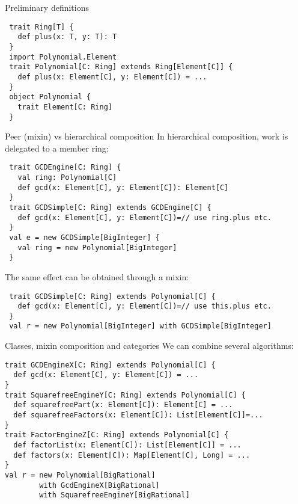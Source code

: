 \documentclass[final]{beamer}
\begin{document}
\begin{frame}[fragile]
\begin{columns}[t]
\begin{column}{.3\linewidth}

  \begin{block}{\large Preliminary definitions}
\tiny %
\begin{lstlisting}
 trait Ring[T] {
   def plus(x: T, y: T): T
 }
 import Polynomial.Element
 trait Polynomial[C: Ring] extends Ring[Element[C]] {
   def plus(x: Element[C], y: Element[C]) = ...
 }
 object Polynomial {
   trait Element[C: Ring]
 }
\end{lstlisting}
  \end{block}
  \hfill
  \begin{block}{\large Peer (mixin) vs hierarchical composition}
\tiny %
{\footnotesize In hierarchical composition, work is delegated to
a member ring:}\par
\begin{lstlisting}
 trait GCDEngine[C: Ring] {
   val ring: Polynomial[C]
   def gcd(x: Element[C], y: Element[C]): Element[C]
 }
 trait GCDSimple[C: Ring] extends GCDEngine[C] {
   def gcd(x: Element[C], y: Element[C])=// use ring.plus etc.
 }
 val e = new GCDSimple[BigInteger] {
   val ring = new Polynomial[BigInteger]
 }
\end{lstlisting}
{\footnotesize The same effect can be obtained through a mixin:}\par
\begin{lstlisting}
 trait GCDSimple[C: Ring] extends Polynomial[C] {
   def gcd(x: Element[C], y: Element[C])=// use this.plus etc.
 }
 val r = new Polynomial[BigInteger] with GCDSimple[BigInteger]
\end{lstlisting}
  \end{block}
  \hfill
  \begin{block}{\large Classes, mixin composition and categories}
\tiny %
{\footnotesize We can combine several algorithms:}\par
\begin{lstlisting}
trait GCDEngineX[C: Ring] extends Polynomial[C] {
  def gcd(x: Element[C], y: Element[C]) = ...
}
trait SquarefreeEngineY[C: Ring] extends Polynomial[C] {
  def squarefreePart(x: Element[C]): Element[C] = ...
  def squarefreeFactors(x: Element[C]): List[Element[C]]=...
}
trait FactorEngineZ[C: Ring] extends Polynomial[C] {
  def factorList(x: Element[C]): List[Element[C]] = ...
  def factors(x: Element[C]): Map[Element[C], Long] = ...
}
val r = new Polynomial[BigRational]
        with GcdEngineX[BigRational] 
        with SquarefreeEngineY[BigRational]

\end{lstlisting}
\end{block}
\end{column}
\end{columns}
\end{frame}
\end{document}
